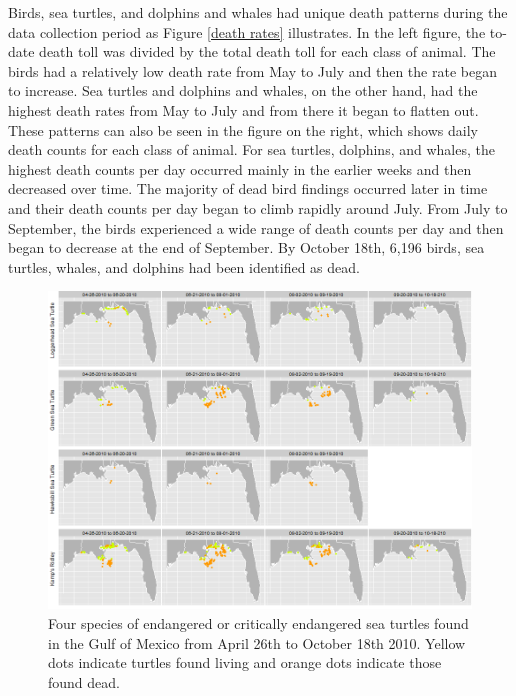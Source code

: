 \documentclass[authoryear,12pt]{elsarticle}
\begin{document}
Birds, sea turtles, and dolphins and whales had unique death patterns during the data collection period as Figure \ref{death rates}  illustrates. In the left figure, the to-date death toll was divided by the total death toll for each class of animal. The birds had a relatively low death rate from May to July and then the rate began to increase. Sea turtles and dolphins and whales, on the other hand, had the highest death rates from May to July and from there it began to flatten out. These patterns can also be seen in the figure on the right, which shows daily death counts for each class of animal. For sea turtles, dolphins, and whales, the highest death counts per day occurred mainly in the earlier weeks and then decreased over time.  The majority of dead bird findings occurred later in time and their death counts per day began to climb rapidly around July. From July to September, the birds experienced a wide range of death counts per day and then began to decrease at the end of September. By October 18th, 6,196 birds, sea turtles, whales, and dolphins had been identified as dead. 

\begin{figure}[htbp] %
   \centering
   \includegraphics[width=6in]{turtles.png} 
   \caption{Four species of endangered or critically endangered sea turtles found in the Gulf of Mexico from April 26th to October 18th 2010.  Yellow dots indicate turtles found living and orange dots indicate those found dead.}
   \label{turtles}
\end{figure}
\end{document}
